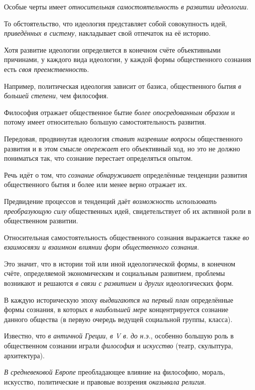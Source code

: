 \documentclass[a4paper,14pt,russian]{extreport}
\begin{document}
Особые черты имеет \emph{относительная самостоятельность в развитии идеологии}.

То обстоятельство, что идеология представляет собой совокупность идей, \emph{приведённых в систему}, накладывает свой отпечаток на её историю.

Хотя развитие идеологии определяется в конечном счёте объективными причинами, у каждого вида идеологии, у каждой формы общественного сознания есть \emph{своя преемственность}.

Например, политическая идеология зависит от базиса, общественного бытия \emph{в большей степени}, чем философия.

Философия отражает общественное бытие \emph{более опосредованным образом} и потому имеет относительно большую самостоятельность развития.

Передовая, продвинутая идеология \emph{ставит назревшие вопросы} общественного развития и в этом смысле \emph{опережает} его объективный ход, но это не должно пониматься так, что сознание перестает определяться опытом.

Речь идёт о том, что \emph{сознание обнаруживает} определённые тенденции развития общественного бытия и более или менее верно отражает их.

Предвидение процессов и тенденций даёт \emph{возможность использовать преобразующую силу} общественных идей, свидетельствует об их активной роли в общественном развитии.

Относительная самостоятельность общественного сознания выражается также \emph{во взаимосвязи и взаимном влиянии форм общественного сознания}.

Это значит, что в истории той или иной идеологической формы, в конечном счёте, определяемой экономическим и социальным развитием, проблемы возникают и решаются \emph{в связи с развитием и других} идеологических форм.

В каждую историческую эпоху \emph{выдвигаются на первый план} определённые формы сознания, в которых \emph{в наибольшей мере} концентрируется сознание данного общества (в первую очередь ведущей социальной группы, класса).

Известно, что \emph{в античной Греции}, \emph{в V в. до н.э}., особенно большую роль в общественном сознании играли \emph{философия} и \emph{искусство} (театр, скульптура, архитектура).

\emph{В средневековой Европе} преобладающее влияние на философию, мораль, искусство, политические и правовые воззрения \emph{оказывала религия}.
\end{document}
